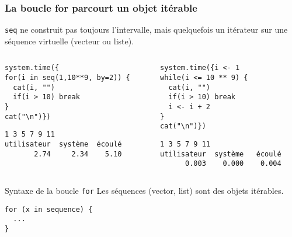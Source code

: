 \documentclass[10pt]{beamer}
\begin{document}
\begin{frame}[fragile]
  \frametitle{La boucle for parcourt un objet itérable}

  \texttt{seq} ne construit pas toujours l'intervalle, mais quelquefois un itérateur sur une séquence virtuelle (vecteur ou liste).
  \vspace{-5pt}
\begin{columns}[t]
\begin{column}{0.5\textwidth}
  \begin{lstlisting}[style=editor]
system.time({
for(i in seq(1,10**9, by=2)) {
  cat(i, "")
  if(i > 10) break
}
cat("\n")})
\end{lstlisting}

\begin{lstlisting}
1 3 5 7 9 11
utilisateur  système  écoulé
       2.74     2.34    5.10
\end{lstlisting}
\end{column}
\begin{column}{0.5\textwidth}
  \begin{lstlisting}[style=editor]
system.time({i <- 1
while(i <= 10 ** 9) {
  cat(i, "")
  if(i > 10) break
  i <- i + 2
}
cat("\n")})
\end{lstlisting}

\begin{lstlisting}
1 3 5 7 9 11
utilisateur  système   écoulé
      0.003    0.000    0.004
\end{lstlisting}
\end{column}
\end{columns}


\begin{alertblock}{Syntaxe de la boucle \texttt{for}}
Les séquences (vector, list) sont des objets itérables.
\begin{lstlisting}[style=edblock]
for (x in sequence) {
  ...
}
\end{lstlisting}
\end{alertblock}
\end{frame}
\end{document}
